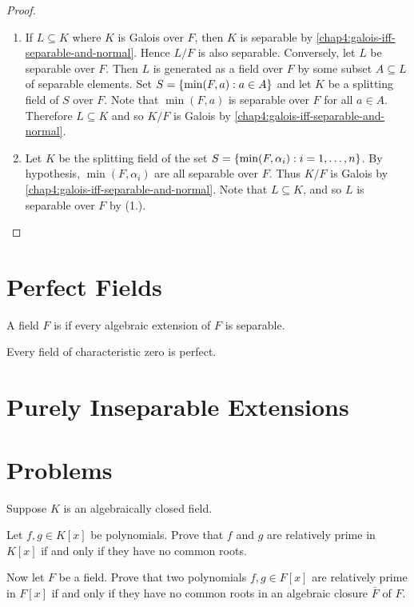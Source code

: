 \begin{proof}
	\begin{enumerate}
		\item If $L \subseteq K$ where $K$ is Galois over $F$, then $K$ is separable by \cref{chap4:galois-iff-separable-and-normal}. Hence $L/F$ is also separable. Conversely, let $L$ be separable over $F$. Then $L$ is generated as a field over $F$ by some subset $A \subseteq L$ of separable elements. Set $S = \lbrace\min(F, a) : a \in A\rbrace$ and let $K$ be a splitting field of $S$ over $F$. Note that $\min(F, a)$ is separable over $F$ for all $a \in A$. Therefore $L \subseteq K$ and so $K/F$ is Galois by \cref{chap4:galois-iff-separable-and-normal}.
		
		\item Let $K$ be the splitting field of the set $S = \lbrace\min(F, \alpha_i) : i = 1, \dotsc, n\rbrace$. By hypothesis, $\min(F,\alpha_i)$ are all separable over $F$. Thus $K/F$ is Galois by \cref{chap4:galois-iff-separable-and-normal}. Note that $L \subseteq K$, and so $L$ is separable over $F$ by (1.). \qedhere 
	\end{enumerate}
\end{proof}

\section{Perfect Fields}

\begin{definition}
	A field $F$ is  if every algebraic extension of $F$ is separable.
\end{definition}
\begin{remark}
	Every field of characteristic zero is perfect.
\end{remark}

\section{Purely Inseparable Extensions}

\section{Problems}
\begin{problems}
	\item Suppose $K$ is an algebraically closed field.
	\begin{problems}
		\item Let $f, g \in K[x]$ be polynomials. Prove that $f$ and $g$ are relatively prime in $K[x]$ if and only if they have no common roots.
		
		\item Now let $F$ be a field. Prove that two polynomials $f, g \in F[x]$ are relatively prime in $F[x]$ if and only if they have no common roots in an algebraic closure $\bar{F}$ of $F$.
	\end{problems}
\end{problems}